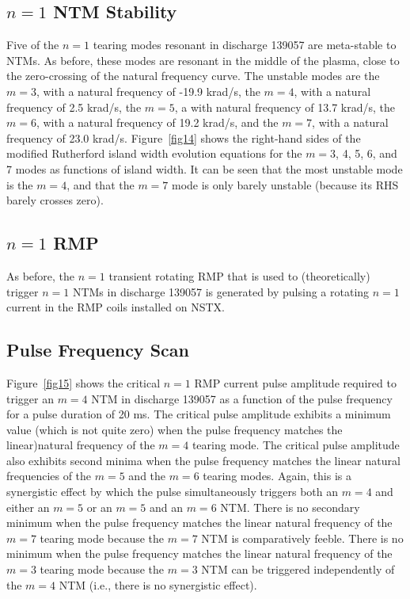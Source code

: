 \documentclass[12pt,prb,aps]{revtex4-1}
\begin{document}
\subsection{$n=1$ NTM Stability}
Five of the $n=1$ tearing modes resonant in discharge 139057 are meta-stable to NTMs. As before, these modes are resonant in the middle of the plasma, close to the zero-crossing of the natural frequency curve. The unstable modes are the $m=3$, with a natural
frequency of -19.9 krad/s,  the $m=4$, with a natural frequency of 2.5 krad/s,  the $m=5$, a with natural
frequency of 13.7 krad/s,  the $m=6$, with a natural frequency of 19.2 krad/s, and the $m=7$, with a natural
frequency of 23.0 krad/s.
 Figure~\ref{fig14} shows the
right-hand sides of the modified Rutherford island width evolution equations for the $m=3$, 4, 5, 6, and 7 modes as functions of island
width. It can be seen that the most unstable mode is the $m=4$, and that the $m=7$ mode is only barely unstable
(because its RHS barely crosses zero). 

\subsection{$n=1$ RMP}
As before, the $n=1$ transient rotating RMP that is used to (theoretically) trigger $n=1$ NTMs in discharge 139057 is generated  by pulsing a rotating $n=1$ current in the RMP coils installed on NSTX. 

\subsection{Pulse Frequency Scan}
Figure~\ref{fig15} shows the critical $n=1$ RMP current  pulse amplitude required to trigger an $m=4$ NTM in discharge 139057 as a
function of the pulse frequency for a pulse duration of 20 ms. The critical pulse amplitude exhibits a minimum value (which is not quite zero) when
the pulse frequency matches the linear)natural frequency of the $m=4$ tearing mode. The critical pulse amplitude
also exhibits  second minima when the pulse frequency matches the
linear natural frequencies of the $m=5$ and the $m=6$ tearing modes. Again, this is a synergistic effect by which the pulse simultaneously 
triggers both an $m=4$ and either an $m=5$ or an $m=5$ and an $m=6$ NTM. There is no secondary minimum
when the pulse frequency matches the linear natural frequency of the $m=7$ tearing mode because the
$m=7$ NTM is comparatively feeble. There is no minimum
when the pulse frequency matches the linear natural frequency of the $m=3$ tearing mode because the
$m=3$ NTM can be triggered independently of the $m=4$ NTM (i.e., there is no synergistic effect). 
\end{document}
